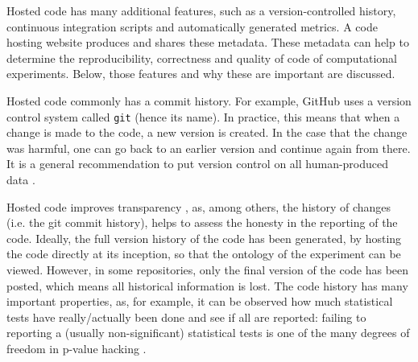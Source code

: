 
Hosted code has many additional features, such as
a version-controlled history, continuous integration scripts
and automatically generated metrics.
A code hosting website produces and shares these metadata.
These metadata can help to determine the
reproducibility, correctness and quality of code
of computational experiments.
Below, those features and why these are important are discussed.


Hosted code commonly has a commit history. For example, GitHub
uses a version control system called \verb|git| (hence its name).
In practice, this means that when a change is made to the code,
a new version is created. In the case that the change was harmful,
one can go back to an earlier version and continue again from there.
It is a general recommendation to put version control
on all human-produced data \cite{wilson2014best}.


Hosted code improves transparency \cite{gorgolewski2016practical},
as, among others, the history of changes (i.e. the git commit history), 
helps to assess the honesty in the reporting of the code. 
Ideally, the full version history of the code 
has been generated, by hosting the code directly at its inception,
so that the ontology of the experiment can be viewed.
However, in some repositories, only the final version of the code has been
posted, which means all historical information is lost.
The code history has many important properties,
as, for example, 
it can be observed how much statistical tests have really/actually been done 
and see if all are reported:
failing to reporting a (usually non-significant) statistical tests is 
one of the many degrees of freedom 
in p-value hacking \cite{wicherts2016degrees}.


